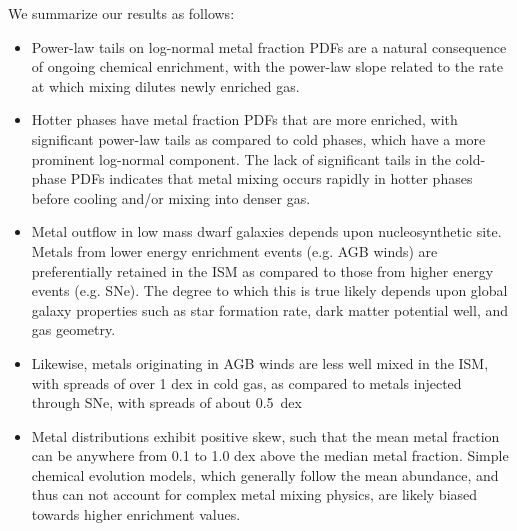 We summarize our results as follows:
\begin{itemize}



\item Power-law tails on log-normal metal fraction PDFs are a natural consequence of ongoing chemical enrichment, with the power-law slope related to the rate at which mixing dilutes newly enriched gas.

\item Hotter phases have metal fraction PDFs that are more enriched, with significant power-law tails as compared to cold phases, which have a more prominent log-normal component. The lack of significant tails in the cold-phase PDFs indicates that metal mixing occurs rapidly in hotter phases before cooling and/or mixing into denser gas. 

\item Metal outflow in low mass dwarf galaxies depends upon nucleosynthetic site. Metals from lower energy enrichment events (e.g. AGB winds) are preferentially retained in the ISM as compared to those from higher energy events (e.g. SNe). The degree to which this is true likely depends upon global galaxy properties such as star formation rate, dark matter potential well, and gas geometry.

\item Likewise, metals originating in AGB winds are less well mixed in the ISM, with spreads of over 1 dex in cold gas, as compared to metals injected through SNe, with spreads of about 0.5~dex

\item Metal distributions exhibit positive skew, such that the mean metal fraction can be anywhere from 0.1 to 1.0 dex above the median metal fraction. Simple chemical evolution models, which generally follow the mean abundance, and thus can not account for complex metal mixing physics, are likely biased towards higher enrichment values.


\end{itemize}


